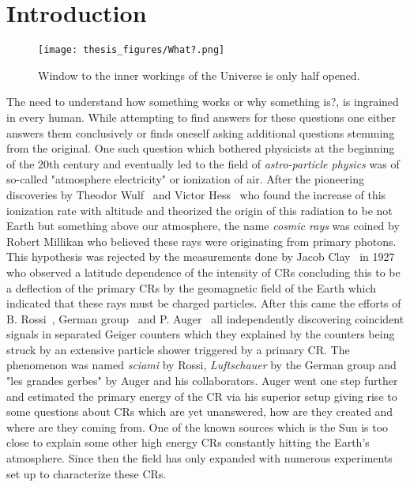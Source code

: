 
\chapter{Introduction}
\label{sec:intro}
\begin{figure}[h!]
\centering
  \texttt{[image: thesis\_figures/What?.png]}
\caption{Window to the inner workings of the Universe is only half opened.}
\label{fig:intro}
\end{figure}
The need to understand how something works or why something is?, is ingrained in every human. While attempting to find answers for these questions one either answers them conclusively or finds oneself asking additional questions stemming from the original. One such question which bothered physicists at the beginning of the 20th century and eventually led to the field of \textit{astro-particle physics} was of so-called "atmosphere electricity" or ionization of air. After the pioneering discoveries by Theodor Wulf~\cite{article_Wulf} and Victor Hess~\cite{Hess:1912srp} who found the increase of this ionization rate with altitude and theorized the origin of this radiation to be not Earth but something above our atmosphere, the name \textit{cosmic rays} was coined by Robert Millikan who believed these rays were originating from primary photons. This hypothesis was rejected by the measurements done by Jacob Clay~\cite{Clay:1927I,Clay:1928II} in 1927 who observed a latitude dependence of the intensity of \glspl{CR} concluding this to be a deflection of the primary \glspl{CR} by the geomagnetic field of the Earth which indicated that these rays must be charged particles. After this came the efforts of B. Rossi~\cite{rossi1933eigenschaften}, German group~\cite{schmeiser1938harten} and P. Auger~\cite{RevModPhys.11.288} all independently discovering coincident signals in separated Geiger counters which they explained by the counters being struck by an extensive particle shower triggered by a primary \gls{CR}. The phenomenon was named \textit{sciami} by Rossi, \textit{Luftschauer} by the German group and "les grandes gerbes" by Auger and his collaborators. Auger went one step further and estimated the primary energy of the \gls{CR} via his superior setup giving rise to some questions about \glspl{CR} which are yet unanswered, how are they created and where are they coming from. One of the known sources which is the Sun is too close to explain some other high energy \glspl{CR} constantly hitting the Earth's atmosphere. Since then the field has only expanded with numerous experiments set up to characterize these \glspl{CR}. 

